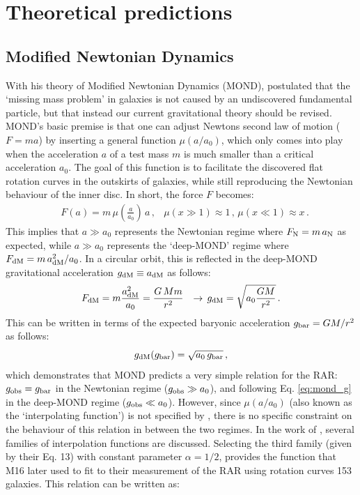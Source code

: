 \documentclass[usenatbib]{mnras}
\newcommand{\un}[1]{_{\rm #1}}
\begin{document}
\section{Theoretical predictions}
\label{sec:theories}

\subsection{Modified Newtonian Dynamics}
\label{sec:MOND}

With his theory of Modified Newtonian Dynamics (MOND), \cite{milgrom1983} postulated that the `missing mass problem' in galaxies is not caused by an undiscovered fundamental particle, but that instead our current gravitational theory should be revised. MOND's basic premise is that one can adjust Newtons second law of motion ($F=ma$) by inserting a general function $\mu(a/a_0)$, which only comes into play when the acceleration $a$ of a test mass $m$ is much smaller than a critical acceleration $a_0$. The goal of this function is to facilitate the discovered flat rotation curves in the outskirts of galaxies, while still reproducing the Newtonian behaviour of the inner disc. In short, the force $F$ becomes:
\begin{align}\label{eq:mond_f}
	& F(a) = m \, \mu(\frac{a}{a_0}) \, a \, ,
	& \mu(x \gg 1) \approx 1 \, , \, \mu(x \ll 1) \approx x \, .
\end{align}
This implies that $a\gg a_0$ represents the Newtonian regime where $F\un{N} = m \, a\un{N}$ as expected, while $a\gg a_0$ represents the `deep-MOND' regime where $F\un{dM}=m \, a\un{dM}^2/a_0$. In a circular orbit, this is reflected in the deep-MOND gravitational acceleration $g\un{dM} \equiv a\un{dM}$ as follows:
\begin{align}\label{eq:mond_g}
	& F\un{dM} = m \frac{a\un{dM}^2}{a_0} = \frac{G \, M m}{r^2}
	& \rightarrow \,  g\un{dM} = \sqrt{a_0 \frac{G M}{r^2}} \, .
\end{align}
This can be written in terms of the expected baryonic acceleration $g\un{bar}=GM/r^2$ as follows:
\begin{equation}
	g\un{dM}(g\un{bar}) = \sqrt{a_0 \, g\un{bar}} \, ,
\end{equation}
which demonstrates that MOND predicts a very simple relation for the RAR: $g\un{obs}=g\un{bar}$ in the Newtonian regime ($g\un{obs}\gg a_0$), and following Eq. \ref{eq:mond_g} in the deep-MOND regime ($g\un{obs}\ll a_0$). However, since $\mu(a/a_0)$ (also known as the `interpolating function') is not specified by \cite{milgrom1983}, there is no specific constraint on the behaviour of this relation in between the two regimes. In the work of \cite{milgrom2008}, several families of interpolation functions are discussed. Selecting the third family (given by their Eq. 13) with constant parameter $\alpha=1/2$, provides the function that M16 later used to fit to their measurement of the RAR using rotation curves 153 galaxies. This relation can be written as:
\end{document}
